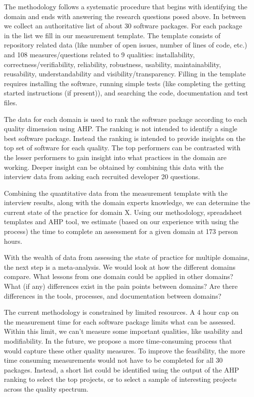\documentclass[runningheads]{llncs}
\begin{document}
The methodology follows a systematic procedure that begins with identifying the
domain and ends with answering the research questions posed above.  In between
we collect an authoritative list of about 30 software packages.  For each
package in the list we fill in our measurement template.  The template consists
of repository related data (like number of open issues, number of lines of code,
etc.) and 108 measures/questions related to 9 qualities: installability,
correctness/verifiability, reliability, robustness, usability, maintainability,
reusability, understandability and visibility/transparency. Filling in the
template requires installing the software, running simple tests (like completing
the getting started instructions (if present)), and searching the code,
documentation and test files.

The data for each domain is used to rank the software package according to each
quality dimension using AHP.  The ranking is not intended to identify a single
best software package.  Instead the ranking is intended to provide insights on
the top set of software for each quality.  The top performers can be contrasted
with the lesser performers to gain insight into what practices in the domain are
working.  Deeper insight can be obtained by combining this data with the
interview data from asking each recruited developer 20 questions.

Combining the quantitative data from the measurement template with the interview
results, along with the domain experts knowledge, we can determine the current
state of the practice for domain X.  Using our methodology, spreadsheet
templates and AHP tool, we estimate (based on our experience with using the
process) the time to complete an assessment for a given domain at 173 person
hours.

With the wealth of data from assessing the state of practice for multiple
domains, the next step is a meta-analysis.  We would look at how the different
domains compare. What lessons from one domain could be applied in other domains?
What (if any) differences exist in the pain points between domains?  Are there
differences in the tools, processes, and documentation between domains?

The current methodology is constrained by limited resources.  A 4 hour cap on
the measurement time for each software package limits what can be assessed.
Within this limit, we can't measure some important qualities, like usability and
modifiability.  In the future, we propose a more time-consuming process that
would capture these other quality measures.  To improve the feasibility, the
more time consuming measurements would not have to be completed for all 30
packages. Instead, a short list could be identified using the output of the AHP
ranking to select the top projects, or to select a sample of interesting
projects across the quality spectrum.
\end{document}
